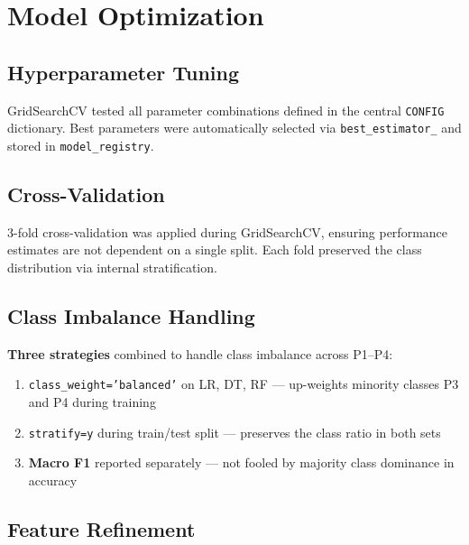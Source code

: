 \documentclass[12pt,a4paper]{article}
\begin{document}
\newpage

\section{Model Optimization}

\subsection{Hyperparameter Tuning}

GridSearchCV tested all parameter combinations defined in the central
\texttt{CONFIG} dictionary. Best parameters were automatically selected
via \texttt{best\_estimator\_} and stored in \texttt{model\_registry}.

\subsection{Cross-Validation}

3-fold cross-validation was applied during GridSearchCV, ensuring performance
estimates are not dependent on a single split. Each fold preserved the class
distribution via internal stratification.

\subsection{Class Imbalance Handling}

\begin{successbox}
  \textbf{Three strategies} combined to handle class imbalance across P1--P4:
  \begin{enumerate}
    \item \texttt{class\_weight='balanced'} on LR, DT, RF
          --- up-weights minority classes P3 and P4 during training
    \item \texttt{stratify=y} during train/test split
          --- preserves the class ratio in both sets
    \item \textbf{Macro F1} reported separately
          --- not fooled by majority class dominance in accuracy
  \end{enumerate}
\end{successbox}

\subsection{Feature Refinement}
\end{document}
